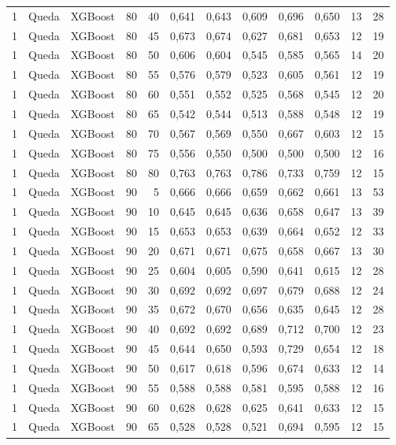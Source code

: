 \begin{longtable}{@{}rllrrrrrrrrr@{}}
1 & Queda & XGBoost & 80 & 40 & 0,641 & 0,643 & 0,609 & 0,696 & 0,650 & 13 & 28 \\
1 & Queda & XGBoost & 80 & 45 & 0,673 & 0,674 & 0,627 & 0,681 & 0,653 & 12 & 19 \\
1 & Queda & XGBoost & 80 & 50 & 0,606 & 0,604 & 0,545 & 0,585 & 0,565 & 14 & 20 \\
1 & Queda & XGBoost & 80 & 55 & 0,576 & 0,579 & 0,523 & 0,605 & 0,561 & 12 & 19 \\
1 & Queda & XGBoost & 80 & 60 & 0,551 & 0,552 & 0,525 & 0,568 & 0,545 & 12 & 20 \\
1 & Queda & XGBoost & 80 & 65 & 0,542 & 0,544 & 0,513 & 0,588 & 0,548 & 12 & 19 \\
1 & Queda & XGBoost & 80 & 70 & 0,567 & 0,569 & 0,550 & 0,667 & 0,603 & 12 & 15 \\
1 & Queda & XGBoost & 80 & 75 & 0,556 & 0,550 & 0,500 & 0,500 & 0,500 & 12 & 16 \\
1 & Queda & XGBoost & 80 & 80 & 0,763 & 0,763 & 0,786 & 0,733 & 0,759 & 12 & 15 \\
1 & Queda & XGBoost & 90 & 5 & 0,666 & 0,666 & 0,659 & 0,662 & 0,661 & 13 & 53 \\
1 & Queda & XGBoost & 90 & 10 & 0,645 & 0,645 & 0,636 & 0,658 & 0,647 & 13 & 39 \\
1 & Queda & XGBoost & 90 & 15 & 0,653 & 0,653 & 0,639 & 0,664 & 0,652 & 12 & 33 \\
1 & Queda & XGBoost & 90 & 20 & 0,671 & 0,671 & 0,675 & 0,658 & 0,667 & 13 & 30 \\
1 & Queda & XGBoost & 90 & 25 & 0,604 & 0,605 & 0,590 & 0,641 & 0,615 & 12 & 28 \\
1 & Queda & XGBoost & 90 & 30 & 0,692 & 0,692 & 0,697 & 0,679 & 0,688 & 12 & 24 \\
1 & Queda & XGBoost & 90 & 35 & 0,672 & 0,670 & 0,656 & 0,635 & 0,645 & 12 & 28 \\
1 & Queda & XGBoost & 90 & 40 & 0,692 & 0,692 & 0,689 & 0,712 & 0,700 & 12 & 23 \\
1 & Queda & XGBoost & 90 & 45 & 0,644 & 0,650 & 0,593 & 0,729 & 0,654 & 12 & 18 \\
1 & Queda & XGBoost & 90 & 50 & 0,617 & 0,618 & 0,596 & 0,674 & 0,633 & 12 & 14 \\
1 & Queda & XGBoost & 90 & 55 & 0,588 & 0,588 & 0,581 & 0,595 & 0,588 & 12 & 16 \\
1 & Queda & XGBoost & 90 & 60 & 0,628 & 0,628 & 0,625 & 0,641 & 0,633 & 12 & 15 \\
1 & Queda & XGBoost & 90 & 65 & 0,528 & 0,528 & 0,521 & 0,694 & 0,595 & 12 & 15 \\

\end{longtable}

